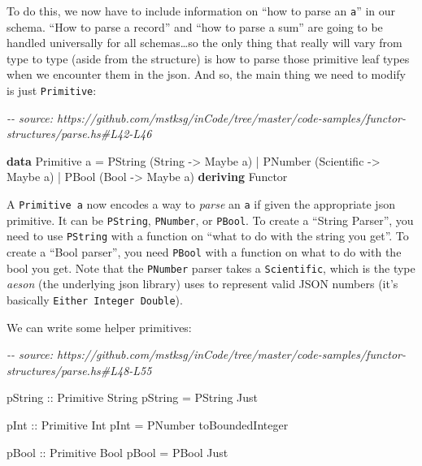 \documentclass[]{article}
\newenvironment{Shaded}{}{}
\newcommand{\CommentTok}[1]{\textcolor[rgb]{0.38,0.63,0.69}{\textit{#1}}}
\newcommand{\DataTypeTok}[1]{\textcolor[rgb]{0.56,0.13,0.00}{#1}}
\newcommand{\KeywordTok}[1]{\textcolor[rgb]{0.00,0.44,0.13}{\textbf{#1}}}
\newcommand{\NormalTok}[1]{#1}
\newcommand{\OperatorTok}[1]{\textcolor[rgb]{0.40,0.40,0.40}{#1}}
\newcommand{\OtherTok}[1]{\textcolor[rgb]{0.00,0.44,0.13}{#1}}
\begin{document}
To do this, we now have to include information on ``how to parse an \texttt{a}''
in our schema. ``How to parse a record'' and ``how to parse a sum'' are going to
be handled universally for all schemas\ldots so the only thing that really will
vary from type to type (aside from the structure) is how to parse those
primitive leaf types when we encounter them in the json. And so, the main thing
we need to modify is just \texttt{Primitive}:

\begin{Shaded}
\begin{Highlighting}[]
\CommentTok{{-}{-} source: https://github.com/mstksg/inCode/tree/master/code{-}samples/functor{-}structures/parse.hs\#L42{-}L46}

\KeywordTok{data} \DataTypeTok{Primitive}\NormalTok{ a }\OtherTok{=}
      \DataTypeTok{PString}\NormalTok{ (}\DataTypeTok{String}     \OtherTok{{-}>} \DataTypeTok{Maybe}\NormalTok{ a)}
    \OperatorTok{|} \DataTypeTok{PNumber}\NormalTok{ (}\DataTypeTok{Scientific} \OtherTok{{-}>} \DataTypeTok{Maybe}\NormalTok{ a)}
    \OperatorTok{|} \DataTypeTok{PBool}\NormalTok{   (}\DataTypeTok{Bool}       \OtherTok{{-}>} \DataTypeTok{Maybe}\NormalTok{ a)}
  \KeywordTok{deriving} \DataTypeTok{Functor}
\end{Highlighting}
\end{Shaded}

A \texttt{Primitive\ a} now encodes a way to \emph{parse} an \texttt{a} if given
the appropriate json primitive. It can be \texttt{PString}, \texttt{PNumber}, or
\texttt{PBool}. To create a ``String Parser'', you need to use \texttt{PString}
with a function on ``what to do with the string you get''. To create a ``Bool
parser'', you need \texttt{PBool} with a function on what to do with the bool
you get. Note that the \texttt{PNumber} parser takes a \texttt{Scientific},
which is the type \emph{aeson} (the underlying json library) uses to represent
valid JSON numbers (it's basically \texttt{Either\ Integer\ Double}).

We can write some helper primitives:

\begin{Shaded}
\begin{Highlighting}[]
\CommentTok{{-}{-} source: https://github.com/mstksg/inCode/tree/master/code{-}samples/functor{-}structures/parse.hs\#L48{-}L55}

\OtherTok{pString ::} \DataTypeTok{Primitive} \DataTypeTok{String}
\NormalTok{pString }\OtherTok{=} \DataTypeTok{PString} \DataTypeTok{Just}

\OtherTok{pInt ::} \DataTypeTok{Primitive} \DataTypeTok{Int}
\NormalTok{pInt }\OtherTok{=} \DataTypeTok{PNumber}\NormalTok{ toBoundedInteger}

\OtherTok{pBool ::} \DataTypeTok{Primitive} \DataTypeTok{Bool}
\NormalTok{pBool }\OtherTok{=} \DataTypeTok{PBool} \DataTypeTok{Just}
\end{Highlighting}
\end{Shaded}
\end{document}
